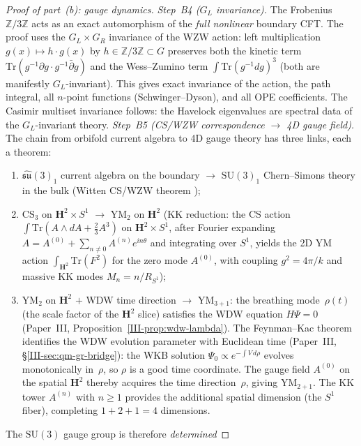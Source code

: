 \begin{proof}[Proof of part~(b): gauge dynamics]
\emph{Step~B4 ($G_L$ invariance).}
The Frobenius $\mathbb{Z}/3\mathbb{Z}$ acts as an
exact automorphism of the \emph{full nonlinear} boundary CFT.
The proof uses the $G_L \times G_R$ invariance of the WZW action:
left multiplication $g(x) \mapsto h\cdot g(x)$ by
$h \in \mathbb{Z}/3\mathbb{Z} \subset G$ preserves both
the kinetic term $\mathrm{Tr}(g^{-1}\partial g \cdot
g^{-1}\bar\partial g)$ and the Wess--Zumino term
$\int \mathrm{Tr}(g^{-1}dg)^3$
(both are manifestly $G_L$-invariant).
This gives exact invariance of the action, the path integral,
all $n$-point functions (Schwinger--Dyson), and all OPE
coefficients.
The Casimir multiset invariance follows:
the Havelock eigenvalues are spectral data of the
$G_L$-invariant theory.
\emph{Step~B5 (CS/WZW correspondence $\to$ 4D gauge field).}
The chain from orbifold current algebra to 4D gauge theory
has three links, each a theorem:
\begin{enumerate}
\item $\widehat{\mathfrak{su}}(3)_1$ current algebra on
  the boundary $\to$ $\mathrm{SU}(3)_1$ Chern--Simons theory
  in the bulk (Witten CS/WZW theorem \citep{Witten1988});
\item $\mathrm{CS}_3$ on $\mathbf{H}^2 \times S^1$ $\to$
  $\mathrm{YM}_2$ on $\mathbf{H}^2$
  (KK reduction: the CS action
  $\int \mathrm{Tr}(A \wedge dA + \tfrac{2}{3}A^3)$
  on $\mathbf{H}^2 \times S^1$, after Fourier expanding
  $A = A^{(0)} + \sum_{n \ne 0} A^{(n)} e^{in\theta}$ and
  integrating over $S^1$, yields the 2D YM action
  $\int_{\mathbf{H}^2}\mathrm{Tr}(F^2)$
  for the zero mode $A^{(0)}$, with coupling $g^2 = 4\pi/k$
  and massive KK modes $M_n = n/R_{S^1}$);
\item $\mathrm{YM}_2$ on $\mathbf{H}^2$ $+$ WDW time direction
  $\to$ $\mathrm{YM}_{3+1}$: the breathing mode~$\rho(t)$
  (the scale factor of the $\mathbf{H}^2$ slice) satisfies
  the WDW equation $H\Psi = 0$
  (Paper~III, Proposition~\ref*{III-prop:wdw-lambda}).
  The Feynman--Kac theorem identifies the WDW
  evolution parameter with Euclidean time
  (Paper~III, \S\ref*{III-sec:qm-gr-bridge}):
  the WKB solution $\Psi_0 \propto e^{-\int V\,d\rho}$
  evolves monotonically in~$\rho$, so $\rho$ is a good time
  coordinate.
  The gauge field $A^{(0)}$ on the spatial $\mathbf{H}^2$
  thereby acquires the time direction~$\rho$, giving
  $\mathrm{YM}_{2+1}$.
  The KK tower $A^{(n)}$ with $n \ge 1$ provides the
  additional spatial dimension (the $S^1$ fiber),
  completing $1 + 2 + 1 = 4$ dimensions.
\end{enumerate}
The $\mathrm{SU}(3)$ gauge group is therefore \emph{determined}

\end{proof}
